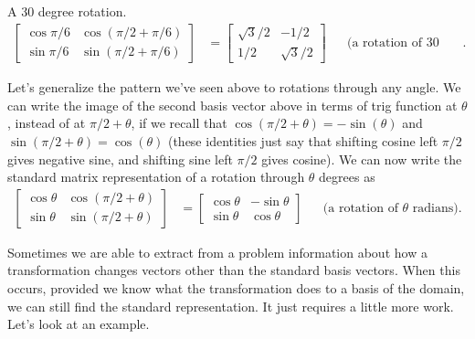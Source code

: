 \begin{example}
{A 30 degree rotation.}
\begin{align*}
\begin{bmatrix}
\cos \pi/6&\cos(\pi/2+\pi/6)\\
\sin\pi/6&\sin(\pi/2+\pi/6)
\end{bmatrix}
&=\begin{bmatrix}\sqrt3/2&-1/2\\1/2&\sqrt3/2\end{bmatrix}  &&\text{(a rotation of 30 degrees)}.
\end{align*}

\end{example}

Let's generalize the pattern we've seen above to rotations through any angle. We can write the image of the second basis vector above in terms of trig function at $\theta$, instead of at $\pi/2+\theta$, if we recall that $\cos(\pi/2+\theta) = -\sin(\theta)$ and $\sin(\pi/2+\theta) = \cos(\theta)$ (these identities just say that shifting cosine left $\pi/2$ gives negative sine, and shifting sine left $\pi/2$ gives cosine).  
We can now write the standard matrix representation of a rotation through $\theta$ degrees as
\begin{align*}
\begin{bmatrix}
\cos \theta&\cos(\pi/2+\theta)\\
\sin \theta&\sin(\pi/2+\theta)
\end{bmatrix}
&=
\begin{bmatrix}
\cos \theta&-\sin\theta\\
\sin \theta&\cos\theta
\end{bmatrix}
&& \text{(a rotation of $\theta$ radians)}.
\end{align*}




Sometimes we are able to extract from a problem information about how a transformation changes vectors other than the standard basis vectors.  When this occurs, provided we know what the transformation does to a basis of the domain, we can still find the standard representation. It just requires a little more work. Let's look at an example. 

